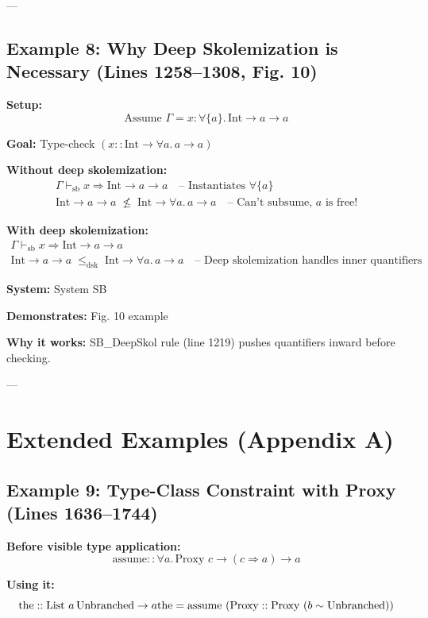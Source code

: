 \documentclass[11pt,a4paper]{article}
\begin{document}
---

\subsection{Example 8: Why Deep Skolemization is Necessary (Lines 1258--1308, Fig. 10)}

\textbf{Setup:}
\[
\text{Assume } \Gamma = x : \forall \{a\}.\, \text{Int} \to a \to a
\]

\textbf{Goal:} Type-check $(x :: \text{Int} \to \forall a.\, a \to a)$

\textbf{Without deep skolemization:}
\[
\begin{array}{l}
\Gamma \vdash_{\text{sb}} x \Rightarrow \text{Int} \to a \to a \quad \text{-- Instantiates } \forall \{a\} \\[4pt]
\text{Int} \to a \to a \;\not\leq\; \text{Int} \to \forall a.\, a \to a \quad \text{-- Can't subsume, } a \text{ is free!}
\end{array}
\]

\textbf{With deep skolemization:}
\[
\begin{array}{l}
\Gamma \vdash_{\text{sb}} x \Rightarrow \text{Int} \to a \to a \\[4pt]
\text{Int} \to a \to a \;\leq_{\text{dsk}}\; \text{Int} \to \forall a.\, a \to a \quad \text{-- Deep skolemization handles inner quantifiers}
\end{array}
\]

\textbf{System:} System SB

\textbf{Demonstrates:} Fig. 10 example

\textbf{Why it works:} SB\_DeepSkol rule (line 1219) pushes quantifiers inward before checking.

---

\section{Extended Examples (Appendix A)}

\subsection{Example 9: Type-Class Constraint with Proxy (Lines 1636--1744)}

\textbf{Before visible type application:}
\[
\text{assume} :: \forall a.\, \text{Proxy } c \to (c \Rightarrow a) \to a
\]

\textbf{Using it:}
\[
\text{the} :: \text{List } a \,\text{Unbranched} \to a \\
\text{the} = \text{assume } (\text{Proxy} :: \text{Proxy } (b \sim \text{Unbranched}))
\]
\end{document}
